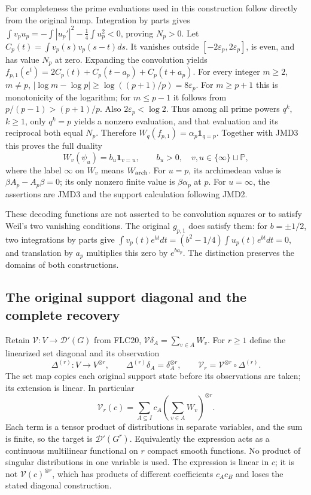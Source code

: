 \documentclass[11pt]{article}
\begin{document}
For completeness the prime evaluations used in this construction
follow directly from the original bump.
Integration by parts gives
$\int v_pu_p=-\int|u_p'|^2-\frac14\int u_p^2<0$, proving $N_p>0$.
Let $C_p(t)=\int v_p(s)v_p(s-t)ds$.
It vanishes outside $[-2\varepsilon_p,2\varepsilon_p]$, is even,
and has value $N_p$ at zero. Expanding the convolution yields
$f_{p,1}(e^t)=2C_p(t)+C_p(t-a_p)+C_p(t+a_p)$.
For every integer $m\ge2$, $m\ne p$,
$|\log m-\log p|\ge\log((p+1)/p)=8\varepsilon_p$.
For $m\ge p+1$ this is monotonicity of the logarithm; for
$m\le p-1$ it follows from $p/(p-1)>(p+1)/p$.
Also $2\varepsilon_p<\log2$.
Thus among all prime powers $q^k$, $k\ge1$, only $q^k=p$ yields
a nonzero evaluation, and that evaluation and its reciprocal both
equal $N_p$. Therefore
$W_q(f_{p,1})=\alpha_p\mathbf1_{q=p}$.
Together with JMD3 this proves the full duality
\[
\boxed{W_v(\psi_u)=b_u\mathbf1_{v=u},\qquad b_u>0,}
\quad v,u\in\{\infty\}\sqcup\mathbb P,
\tag{JMD5}
\]
where the label $\infty$ on $W_v$ means $W_{\rm arch}$.
For $u=p$, its archimedean value is
$\beta A_p-A_p\beta=0$; its only nonzero finite value is
$\beta\alpha_p$ at $p$. For $u=\infty$, the assertions are JMD3
and the support calculation following JMD2.

These decoding functions are not asserted to be convolution squares
or to satisfy Weil's two vanishing conditions.
The original $g_{p,1}$ does satisfy them: for $b=\pm1/2$,
two integrations by parts give
$\int v_p(t)e^{bt}dt=(b^2-1/4)\int u_p(t)e^{bt}dt=0$,
and translation by $a_p$ multiplies this zero by $e^{ba_p}$.
The distinction preserves the domains of both constructions.

\subsection{The original support diagonal and the complete recovery}

Retain $\mathcal V:V\to\mathcal D'(G)$ from FLC20,
$\mathcal V\delta_A=\sum_{v\in A}W_v$.
For $r\ge1$ define the linearized set diagonal and its observation
\[
\Delta^{(r)}:V\longrightarrow V^{\otimes r},\qquad
\Delta^{(r)}\delta_A=\delta_A^{\otimes r},\qquad
\mathcal V_r=\mathcal V^{\otimes r}\circ\Delta^{(r)}.
\tag{JMD6}
\]
The set map copies each original support state before its
observations are taken; its extension is linear.
In particular
\[
\mathcal V_r(c)
=\sum_{A\subseteq I}c_A
       \left(\sum_{v\in A}W_v\right)^{\otimes r}.
\tag{JMD7}
\]
Each term is a tensor product of distributions in separate variables,
and the sum is finite, so the target is $\mathcal D'(G^r)$.
Equivalently the expression acts as a continuous multilinear
functional on $r$ compact smooth functions.
No product of singular distributions in one variable is used.
The expression is linear in $c$; it is not
$\mathcal V(c)^{\otimes r}$, which has products of different
coefficients $c_Ac_B$ and loses the stated diagonal construction.
\end{document}
